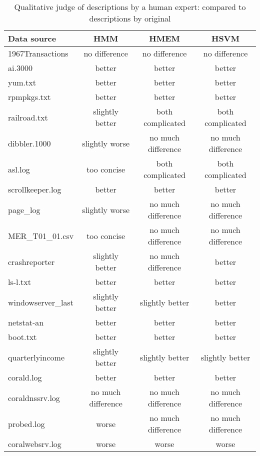 \begin{table}[th]
\begin{center}
\begin{tabular}{|l||c|c|c|}\hline
Data source & HMM & HMEM & HSVM \\ \hline 
1967Transactions & no difference & no difference & no difference   \\\hline 
ai.3000 & better & better & better \\ \hline
yum.txt & better &  better & better \\ \hline
rpmpkgs.txt & better & better & better\\ \hline
railroad.txt & slightly better & both complicated & both complicated  \\ \hline
dibbler.1000 & slightly worse & no much difference & no much difference   \\ \hline
asl.log & too concise & both complicated & both complicated \\ \hline
scrollkeeper.log  &  better & better & better \\ \hline
page\_log  & slightly worse & no much difference & no much difference \\ \hline
MER\_T01\_01.csv & too concise & no much difference & no much difference \\ \hline
crashreporter & slightly better & no much difference & better \\ \hline
ls-l.txt & better & better & better \\ \hline
windowserver\_last & slightly better & slightly better & better \\ \hline
netstat-an & better & better & better \\ \hline
boot.txt & better &  better & better \\ \hline
quarterlyincome & slightly better & slightly better & slightly better   \\ \hline
corald.log & better &  better & better \\ \hline
coraldnssrv.log  & no much difference &  no much difference & no much difference\\ \hline
probed.log & worse & no much difference & no much difference \\ \hline
coralwebsrv.log & worse & worse & worse \\\hline
\end{tabular}
\caption{Qualitative judge of descriptions by a human expert: compared
to descriptions by original \learnpads{}}
\label{tab:expert}
\end{center}
\end{table}

